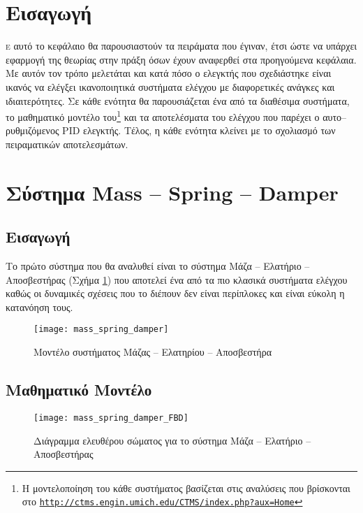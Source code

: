 


\section{Εισαγωγή}

\lettrine[findent=2pt]{}{ε} αυτό το κεφάλαιο θα παρουσιαστούν τα πειράματα που έγιναν, έτσι ώστε να υπάρχει εφαρμογή της θεωρίας στην πράξη όσων έχουν αναφερθεί στα προηγούμενα κεφάλαια. Με αυτόν τον τρόπο μελετάται και κατά πόσο ο ελεγκτής που σχεδιάστηκε είναι ικανός να ελέγξει ικανοποιητικά συστήματα ελέγχου με διαφορετικές ανάγκες και ιδιαιτερότητες. Σε κάθε ενότητα θα παρουσιάζεται ένα από τα διαθέσιμα συστήματα, το μαθηματικό μοντέλο του\footnote{Η μοντελοποίηση του κάθε συστήματος βασίζεται στις αναλύσεις που βρίσκονται στο \texttt{\url{http://ctms.engin.umich.edu/CTMS/index.php?aux=Home}}} και τα αποτελέσματα του ελέγχου που παρέχει ο αυτο--ρυθμιζόμενος PID ελεγκτής. Τέλος, η κάθε ενότητα κλείνει με το σχολιασμό των πειραματικών αποτελεσμάτων.

\section{Σύστημα Mass -- Spring -- Damper} \label{sec:mass_spring_damper}

\subsection{Εισαγωγή}

Το πρώτο σύστημα που θα αναλυθεί είναι το σύστημα Μάζα -- Ελατήριο -- Αποσβεστήρας (Σχήμα \ref{fig:mass_spring_damper}) που αποτελεί ένα από τα πιο κλασικά συστήματα ελέγχου καθώς οι δυναμικές σχέσεις που το διέπουν δεν είναι περίπλοκες και είναι εύκολη η κατανόηση τους.

\begin{figure}[h]
  \centering
  \texttt{[image: mass\_spring\_damper]}
  \caption{Μοντέλο συστήματος Μάζας -- Ελατηρίου -- Αποσβεστήρα}
  \label{fig:mass_spring_damper}
\end{figure}

\subsection{Μαθηματικό Μοντέλο}

\begin{figure}[h]
  \centering
  \texttt{[image: mass\_spring\_damper\_FBD]}
  \caption{Διάγραμμα ελευθέρου σώματος για το σύστημα Μάζα -- Ελατήριο -- Αποσβεστήρας}
  \label{fig:mass_spring_damper_FBD}
\end{figure}

